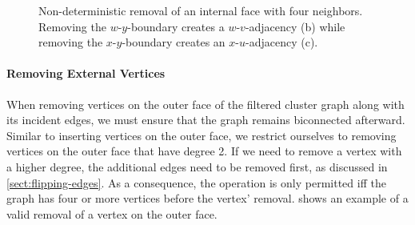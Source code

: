\begin{figure}[H]
	\centering
	\quad
	\qquad
	\caption{Non-deterministic removal of an internal face with four neighbors. Removing the $w$-$y$-boundary creates a $w$-$v$-adjacency (b) while removing the $x$-$y$-boundary creates an $x$-$u$-adjacency (c).}
	\label{fig:remove-vertex-nondeterministic-adjacencies}
\end{figure}



\paragraph{Removing External Vertices}

When removing vertices on the outer face of the filtered cluster graph along with its incident edges, we must ensure that the graph remains biconnected afterward.
Similar to inserting vertices on the outer face, we restrict ourselves to removing vertices on the outer face that have degree 2.
If we need to remove a vertex with a higher degree, the additional edges need to be removed first, as discussed in \cref{sect:flipping-edges}.
As a consequence, the operation is only permitted iff the graph has four or more vertices before the vertex' removal.
 shows an example of a valid removal of a vertex on the outer face.

